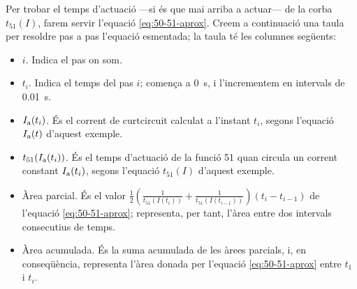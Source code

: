 \begin{exemple}
 	Per trobar el temps d'actuació ---si és que mai arriba a actuar--- de la corba $t_{51}(I)$, farem servir l'equació \eqref{eq:50-51-aprox}.  	Creem a continuació una taula per resoldre pas a pas l'equació esmentada; la taula té les columnes següents:
 	\begin{itemize}
 	 \item $i$. Indica el pas on som.
 	 \item $t_i$. Indica el temps del pas $i$; comença a \qty{0}{s}, i l'incrementem en intervals de  \qty{0,01}{s}.
 	 \item  $I_\mathrm{a}(t_i)$. És el corrent de curtcircuit calculat a l'instant $t_i$, segons l'equació $I_\mathrm{a}(t)$ d'aquest exemple.
 	 \item $t_{51}(I_\mathrm{a}(t_i))$. És el temps d'actuació de la funció 51 quan circula un corrent constant $I_\mathrm{a}(t_i)$, segons l'equació $t_{51}(I)$ d'aquest exemple.
 	 \item Àrea parcial. És el valor $\frac{1}{2} \left( \frac{1}{t_{51}(I(t_i))} + \frac{1}{t_{51}(I(t_{i-1}))} \right) (t_i - t_{i-1})$ de l'equació \eqref{eq:50-51-aprox}; representa, per tant, l'àrea entre dos intervals consecutius de temps.
 	 \item Àrea acumulada. És la suma acumulada de les àrees parcials, i, en conseqüència, representa l'àrea donada per l'equació \eqref{eq:50-51-aprox} entre $t_1$ i $t_i$.
    \end{itemize}
 	

\end{exemple}
